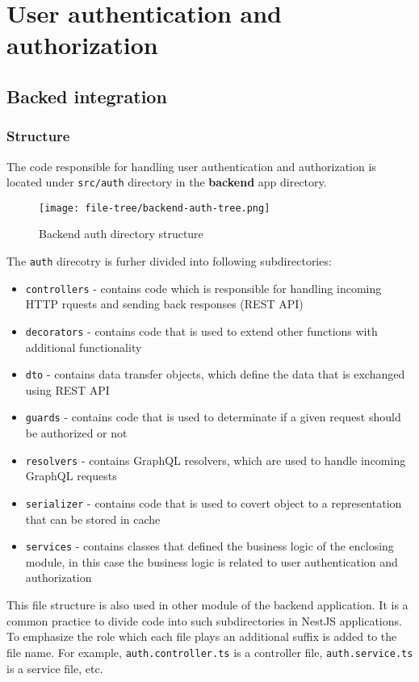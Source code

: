 \documentclass[../main.tex]{subfiles}
\begin{document}
\section{User authentication and authorization}

\subsection{Backed integration}

\subsubsection{Structure}

The code responsible for handling user authentication and authorization is located
under \texttt{src/auth} directory in the \textbf{backend} app directory.

\begin{figure}[H]
  \centering
  \texttt{[image: file-tree/backend-auth-tree.png]}
  \caption{Backend auth directory structure}
\end{figure}

The \texttt{auth} direcotry is furher divided into following subdirectories:
\begin{itemize}
  \item \texttt{controllers} - contains code which is responsible for handling incoming HTTP rquests and sending back responses (REST API)
  \item \texttt{decorators} - contains code that is used to extend other functions with additional functionality
  \item \texttt{dto} - contains data transfer objects, which define the data that is exchanged using REST API
  \item \texttt{guards} - contains code that is used to determinate if a given request should be authorized or not
  \item \texttt{resolvers} - contains GraphQL resolvers, which are used to handle incoming GraphQL requests
  \item \texttt{serializer} - contains code that is used to covert object to a representation that can be stored in cache
  \item \texttt{services} - contains classes that defined the business logic of the enclosing module, in this case the business logic is related to user authentication and authorization
\end{itemize}
This file structure is also used in other module of the backend application. It is a common practice to divide code into such subdirectories in NestJS applications.
To emphasize the role which each file plays an additional suffix is added to the file name. For example, \texttt{auth.controller.ts} is a controller file, \texttt{auth.service.ts} is a service file, etc.
\end{document}
